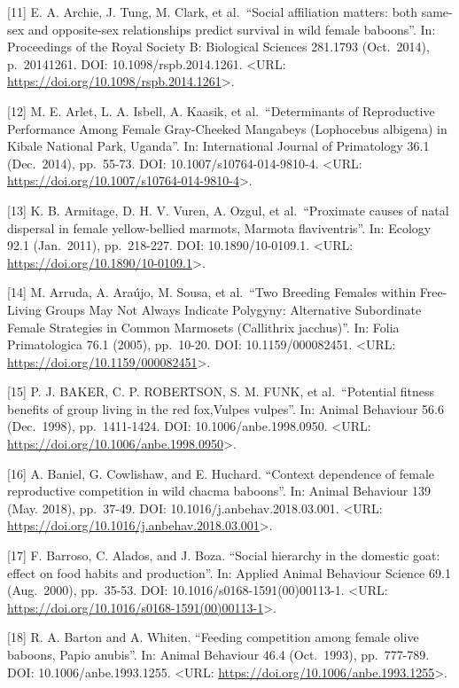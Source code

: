 \documentclass[
]{article}
\begin{document}
{[}11{]} E. A. Archie, J. Tung, M. Clark, et al.~``Social affiliation
matters: both same-sex and opposite-sex relationships predict survival
in wild female baboons''. In: Proceedings of the Royal Society B:
Biological Sciences 281.1793 (Oct.~2014), p.~20141261. DOI:
10.1098/rspb.2014.1261. \textless URL:
\url{https://doi.org/10.1098/rspb.2014.1261}\textgreater.

{[}12{]} M. E. Arlet, L. A. Isbell, A. Kaasik, et al.~``Determinants of
Reproductive Performance Among Female Gray-Cheeked Mangabeys (Lophocebus
albigena) in Kibale National Park, Uganda''. In: International Journal
of Primatology 36.1 (Dec.~2014), pp.~55-73. DOI:
10.1007/s10764-014-9810-4. \textless URL:
\url{https://doi.org/10.1007/s10764-014-9810-4}\textgreater.

{[}13{]} K. B. Armitage, D. H. V. Vuren, A. Ozgul, et al.~``Proximate
causes of natal dispersal in female yellow-bellied marmots, Marmota
flaviventris''. In: Ecology 92.1 (Jan.~2011), pp.~218-227. DOI:
10.1890/10-0109.1. \textless URL:
\url{https://doi.org/10.1890/10-0109.1}\textgreater.

{[}14{]} M. Arruda, A. Araújo, M. Sousa, et al.~``Two Breeding Females
within Free-Living Groups May Not Always Indicate Polygyny: Alternative
Subordinate Female Strategies in Common Marmosets (Callithrix
jacchus)''. In: Folia Primatologica 76.1 (2005), pp.~10-20. DOI:
10.1159/000082451. \textless URL:
\url{https://doi.org/10.1159/000082451}\textgreater.

{[}15{]} P. J. BAKER, C. P. ROBERTSON, S. M. FUNK, et al.~``Potential
fitness benefits of group living in the red fox,Vulpes vulpes''. In:
Animal Behaviour 56.6 (Dec.~1998), pp.~1411-1424. DOI:
10.1006/anbe.1998.0950. \textless URL:
\url{https://doi.org/10.1006/anbe.1998.0950}\textgreater.

{[}16{]} A. Baniel, G. Cowlishaw, and E. Huchard. ``Context dependence
of female reproductive competition in wild chacma baboons''. In: Animal
Behaviour 139 (May. 2018), pp.~37-49. DOI:
10.1016/j.anbehav.2018.03.001. \textless URL:
\url{https://doi.org/10.1016/j.anbehav.2018.03.001}\textgreater.

{[}17{]} F. Barroso, C. Alados, and J. Boza. ``Social hierarchy in the
domestic goat: effect on food habits and production''. In: Applied
Animal Behaviour Science 69.1 (Aug.~2000), pp.~35-53. DOI:
10.1016/s0168-1591(00)00113-1. \textless URL:
\url{https://doi.org/10.1016/s0168-1591(00)00113-1}\textgreater.

{[}18{]} R. A. Barton and A. Whiten. ``Feeding competition among female
olive baboons, Papio anubis''. In: Animal Behaviour 46.4 (Oct.~1993),
pp.~777-789. DOI: 10.1006/anbe.1993.1255. \textless URL:
\url{https://doi.org/10.1006/anbe.1993.1255}\textgreater.
\end{document}
